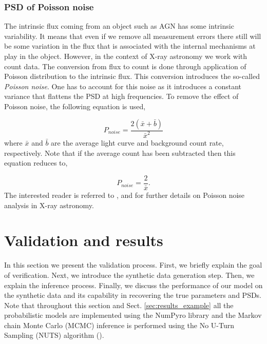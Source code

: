 \documentclass{aa}
\begin{document}
\subsubsection{PSD of Poisson noise}
\label{subsubsec:poissonNoise}
The intrinsic flux coming from an object such as AGN has some intrinsic variability. It means that even if we remove all measurement errors there still will be some variation in the flux that is associated with the internal mechanisms at play in the object. However, in the context of X-ray astronomy we work with count data. The conversion from flux to count is done through application of Poisson distribution to the intrinsic flux. This conversion introduces the so-called \textit{Poisson noise}. One has to account for this noise as it introduces a constant variance that flattens the PSD at high frequencies. To remove the effect of Poisson noise, the following equation is used,

\begin{equation}
P_{noise} = \frac{2(\bar x + \bar b)}{\bar x^2}
\label{eq:poisson_noise}
\end{equation}
where $\bar x$ and $ \bar b$ are the average light curve and background count rate, respectively. Note that if the average count has been subtracted then this equation reduces to,

\begin{equation}
P_{noise} = \frac{2}{\bar x}.
\label{eq:poisson_noise_reduced}
\end{equation}
The interested reader is referred to \citet{Vaughan2003}, \citet{Arevalo2008} and \citet{Uttley2014} for further details on Poisson noise analysis in X-ray astronomy. \\


\section{Validation and results}
\label{sec:validation}
In this section we present the validation process. First, we briefly explain the goal of verification. Next, we introduce the synthetic data generation step. Then, we explain the inference process. Finally, we discuss the performance of our model on the synthetic data and its capability in recovering the true parameters and PSDs. Note that throughout this section and Sect. \ref{sec:results_example} all the probabilistic models are implemented using the NumPyro library \citep{phan2019composable} and the Markov chain Monte Carlo (MCMC) inference is performed using the No U-Turn Sampling (NUTS) algorithm (\citealt{HoffmanGelman2014}). \\ 
\end{document}
